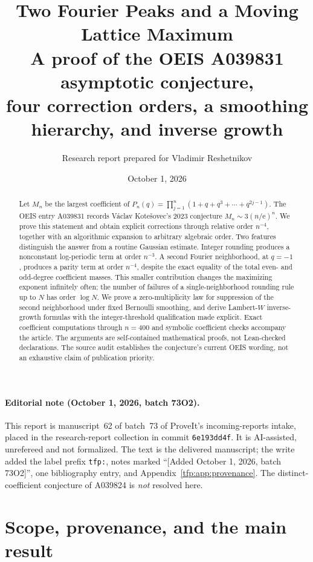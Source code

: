 \documentclass[11pt,a4paper]{article}
\title{\textbf{Two Fourier Peaks and a Moving Lattice Maximum}\\[5pt]
\large A proof of the OEIS A039831 asymptotic conjecture,\\
four correction orders, a smoothing hierarchy, and inverse growth}
\author{Research report prepared for Vladimir Reshetnikov}
\date{October 1, 2026}
\numberwithin{equation}{section}
\theoremstyle{definition}\newtheorem{definition}[theorem]{Definition}
\theoremstyle{remark}\newtheorem{remark}[theorem]{Remark}
\newcommand{\ee}{\mathrm e}
\begin{document}
\maketitle
\begin{abstract}
Let $M_n$ be the largest coefficient of
$P_n(q)=\prod_{j=1}^n(1+q+q^3+\cdots+q^{2j-1})$.
The OEIS entry A039831 records V\'aclav Kote\v{s}ovec's 2023 conjecture
$M_n\sim3(n/\ee)^n$. We prove this statement and obtain explicit corrections
through relative order $n^{-4}$, together with an algorithmic expansion to
arbitrary algebraic order. Two features distinguish the answer from a routine
Gaussian estimate. Integer rounding produces a nonconstant log-periodic term
at order $n^{-3}$. A second Fourier neighborhood, at $q=-1$, produces a
parity term at order $n^{-4}$, despite the exact equality of the total even-
and odd-degree coefficient masses. This smaller contribution changes the
maximizing exponent infinitely often; the number of failures of a
single-neighborhood rounding rule up to $N$ has order $\log N$.
We prove a zero-multiplicity law for suppression of the second neighborhood
under fixed Bernoulli smoothing, and derive Lambert-$W$ inverse-growth
formulas with the integer-threshold qualification made explicit.
Exact coefficient computations through $n=400$ and symbolic coefficient
checks accompany the article. The arguments are self-contained mathematical
proofs, not Lean-checked declarations. The source audit establishes the
conjecture's current OEIS wording, not an exhaustive claim of publication
priority.
\end{abstract}

\paragraph{Editorial note (October 1, 2026, batch 73O2).}
This report is manuscript~62 of batch~73 of ProveIt's incoming-reports
intake, placed in the research-report collection in commit
\texttt{6e193dd4f}. It is AI-assisted, unrefereed and not formalized. The
text is the delivered manuscript; the write added the label prefix
\texttt{tfp:}, notes marked ``[Added October 1, 2026, batch 73O2]'', one
bibliography entry, and Appendix~\ref{tfp:app:provenance}. The distinct-coefficient
conjecture of A039824 is \emph{not} resolved here.
\newpage
\tableofcontents
\newpage

\section{Scope, provenance, and the main result}
\end{document}
